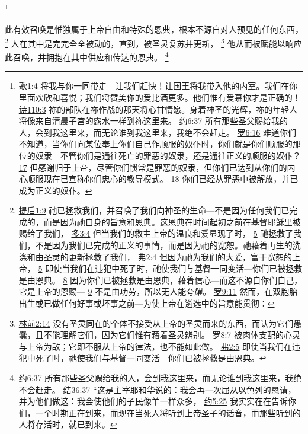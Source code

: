 \documentclass[12pt, a4paper, oneside]{ctexart}
\newcounter{parnum}[section]
\newcommand{\N}{%
   \noindent\refstepcounter{parnum}%
    \makebox[\parindent][l]{\textbf{\arabic{parnum}.}}}
\begin{document}
	\footnote {
		\href{https://biblehub.com/songs/1-4.htm}{歌1:4} 将我与你一同带走---让我们赶快！让国王将我带入他的内室。我们在你里面欢欣和喜悦；我们将赞美你的爱比酒更多。他们惟有爱慕你才是正确的！
		\href{https://biblehub.com/psalms/110-3.htm}{诗110:3} 祢的部队在祢作战的那天将心甘情愿。身着神圣的光辉，祢的年轻人将像来自清晨子宫的露水一样到祢这里来。
		\href{https://biblehub.com/john/6-37.htm}{约6:37} 所有那些圣父赐给我的人，会到我这里来，而无论谁到我这里来，我绝不会赶走。
		\href{https://biblehub.com/romans/6-16.htm}{罗6:16} 难道你们不知道，当你们向某位奉上你们自己作顺服的奴仆时，你们就是你们顺服的那位的奴隶---不管你们是通往死亡的罪恶的奴隶，还是通往正义的顺服的奴仆？
		\href{https://biblehub.com/romans/6-17.htm}{17} 但感谢归于上帝，尽管你们惯常是罪恶的奴隶，但你们已达到从你们的内心顺服现在已宣称你们忠心的教导模式。
		\href{https://biblehub.com/romans/6-18.htm}{18} 你们已经从罪恶中被解放，并已成为正义的奴仆。
	}

\N 此有效召唤是惟独属于上帝自由和特殊的恩典，根本不源自对人预见的任何东西，
	\footnote {
		\href{https://biblehub.com/2_timothy/1-9.htm}{提后1:9} 祂已拯救我们，并召唤了我们向神圣的生命---不是因为任何我们已完成的，而是因为祂自身的旨意和恩典。这恩典在时间起初之前在基督耶稣里被赐给了我们，
		\href{https://biblehub.com/titus/3-4.htm}{多3:4} 但当我们的救主上帝的温良和爱显现了时，
		\href{https://biblehub.com/titus/3-5.htm}{5} 祂拯救了我们，不是因为我们已完成的正义的事情，而是因为祂的宽恕。祂藉着再生的洗涤和由圣灵的更新拯救了我们，
		\href{https://biblehub.com/ephesians/2-4.htm}{弗2:4} 但因为祂为我们的大爱，富于宽恕的上帝，
		\href{https://biblehub.com/ephesians/2-5.htm}{5} 即使当我们在违犯中死了时，祂使我们与基督一同变活---你们已被拯救是由恩典。
		\href{https://biblehub.com/ephesians/2-8.htm}{8} 因为你们已被拯救是由恩典，藉着信心---而这不源自你们自己，它是上帝的恩赐---
		\href{https://biblehub.com/ephesians/2-9.htm}{9} 不是由功劳，所以无人能夸耀。
		\href{https://biblehub.com/romans/9-11.htm}{罗9:11} 然而，在双胞胎出生或已做任何好事或坏事之前---为使上帝在遴选中的旨意能贯彻：
	}
	人在其中是完完全全被动的，直到，被圣灵复苏并更新，
	\footnote {
		\href{https://biblehub.com/1_corinthians/2-14.htm}{林前2:14} 没有圣灵同在的个体不接受从上帝的圣灵而来的东西，而认为它们愚蠢，且不能理解它们，因为它们惟有藉着圣灵辨别。
		\href{https://biblehub.com/romans/8-7.htm}{罗8:7} 被肉体支配的心灵与上帝为敌；它即不服从上帝的律法，也不能如此做。
		\href{https://biblehub.com/ephesians/2-5.htm}{弗2:5} 即使当我们在违犯中死了时，祂使我们与基督一同变活---你们已被拯救是由恩典。
	}
	他从而被赋能以响应此召唤，并拥抱在其中供应和传达的恩典。
	\footnote {
		\href{https://biblehub.com/john/6-37.htm}{约6:37} 所有那些圣父赐给我的人，会到我这里来，而无论谁到我这里来，我绝不会赶走。
		\href{https://biblehub.com/ezekiel/36-37.htm}{结36:37} “这是主宰耶和华说的：我会再一次屈从以色列的恳请，并为他们做这：我会使他们的子民像羊一样众多，
		\href{https://biblehub.com/john/5-25.htm}{约5:25} 我实实在在告诉你们，一个时期正在到来，而现在当死人将听到上帝圣子的话音，而那些听到的人将存活时，就已到来。
	}
\end{document}
